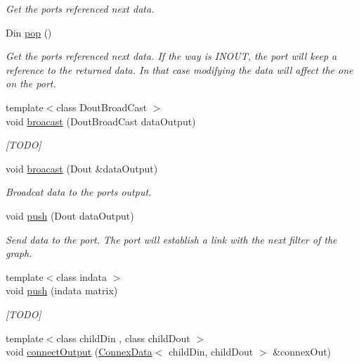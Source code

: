 \begin{DoxyCompactItemize}
\begin{DoxyCompactList}\small\item\em Get the port\textquotesingle{}s referenced next data. \end{DoxyCompactList}\item 
Din \hyperlink{classfilter_1_1data_1_1_connex_data_a4367cfe424cefb90470098814a33e326}{pop} ()
\begin{DoxyCompactList}\small\item\em Get the port\textquotesingle{}s referenced next data. If the way is I\+N\+O\+UT, the port will keep a reference to the returned data. In that case modifying the data will affect the one on the port. \end{DoxyCompactList}\item 
{\footnotesize template$<$class Dout\+Broad\+Cast $>$ }\\void \hyperlink{classfilter_1_1data_1_1_connex_data_abd05d79fd08000ff3c92e6fcc8cd41be}{broacast} (Dout\+Broad\+Cast data\+Output)
\begin{DoxyCompactList}\small\item\em \mbox{[}T\+O\+DO\mbox{]} \end{DoxyCompactList}\item 
void \hyperlink{classfilter_1_1data_1_1_connex_data_a16e8347560f6e429a410f21c0b9bd48d}{broacast} (Dout \&data\+Output)
\begin{DoxyCompactList}\small\item\em Broadcat data to the port\textquotesingle{}s output. \end{DoxyCompactList}\item 
void \hyperlink{classfilter_1_1data_1_1_connex_data_a703d8b2465a59a9c8ca79436a1ddfa2b}{push} (Dout data\+Output)
\begin{DoxyCompactList}\small\item\em Send data to the port. The port will establish a link with the next filter of the graph. \end{DoxyCompactList}\item 
{\footnotesize template$<$class indata $>$ }\\void \hyperlink{classfilter_1_1data_1_1_connex_data_af5ed83082314838718aee4fbda767ff9}{push} (indata matrix)
\begin{DoxyCompactList}\small\item\em \mbox{[}T\+O\+DO\mbox{]} \end{DoxyCompactList}\item 
{\footnotesize template$<$class child\+Din , class child\+Dout $>$ }\\void \hyperlink{classfilter_1_1data_1_1_connex_data_a93772066f126cab918b46b285c63073a}{connect\+Output} (\hyperlink{classfilter_1_1data_1_1_connex_data}{Connex\+Data}$<$ child\+Din, child\+Dout $>$ \&connex\+Out)

\end{DoxyCompactItemize}
